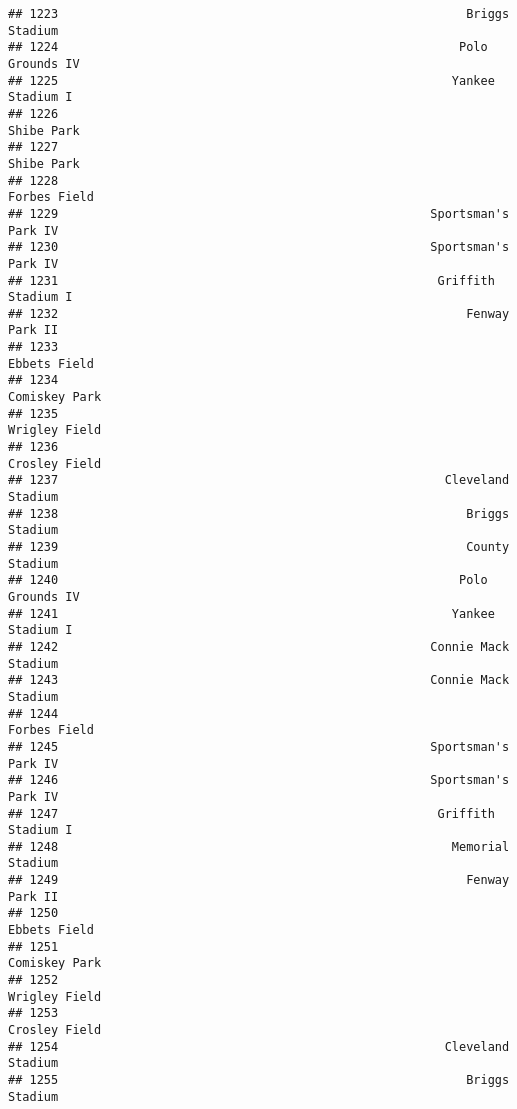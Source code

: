 \documentclass[]{article}
\begin{document}
\begin{verbatim}
## 1223                                                         Briggs Stadium
## 1224                                                        Polo Grounds IV
## 1225                                                       Yankee Stadium I
## 1226                                                             Shibe Park
## 1227                                                             Shibe Park
## 1228                                                           Forbes Field
## 1229                                                    Sportsman's Park IV
## 1230                                                    Sportsman's Park IV
## 1231                                                     Griffith Stadium I
## 1232                                                         Fenway Park II
## 1233                                                           Ebbets Field
## 1234                                                          Comiskey Park
## 1235                                                          Wrigley Field
## 1236                                                          Crosley Field
## 1237                                                      Cleveland Stadium
## 1238                                                         Briggs Stadium
## 1239                                                         County Stadium
## 1240                                                        Polo Grounds IV
## 1241                                                       Yankee Stadium I
## 1242                                                    Connie Mack Stadium
## 1243                                                    Connie Mack Stadium
## 1244                                                           Forbes Field
## 1245                                                    Sportsman's Park IV
## 1246                                                    Sportsman's Park IV
## 1247                                                     Griffith Stadium I
## 1248                                                       Memorial Stadium
## 1249                                                         Fenway Park II
## 1250                                                           Ebbets Field
## 1251                                                          Comiskey Park
## 1252                                                          Wrigley Field
## 1253                                                          Crosley Field
## 1254                                                      Cleveland Stadium
## 1255                                                         Briggs Stadium

\end{verbatim}
\end{document}
